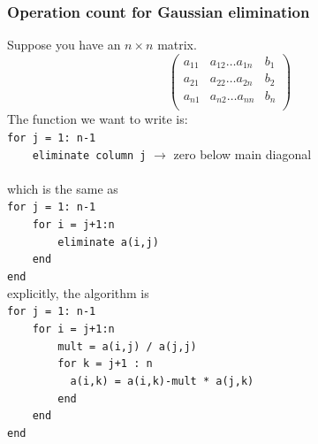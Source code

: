 \documentclass[11pt]{article}
\begin{document}
\subsubsection{Operation count for Gaussian elimination}
Suppose you have an $n \times n$ matrix.
\[
    \begin{pmatrix}
        a_{11} & a_{12} \dots a_{1n} & b_1 \\
        a_{21} & a_{22} \dots a_{2n} & b_2 \\
        a_{n1} & a_{n2} \dots a_{nn} & b_n \\
    \end{pmatrix}
\]
The function we want to write is:\\
\verb|for j = 1: n-1|\\
\verb|    eliminate column j| $\longrightarrow$ zero below main diagonal\\\\
which is the same as\\
\verb|for j = 1: n-1|\\
\verb|    for i = j+1:n|\\
\verb|        eliminate a(i,j)|\\
\verb|    end|\\
\verb|end|\\

\newpage
explicitly, the algorithm is \\
\verb|for j = 1: n-1|\\
\verb|    for i = j+1:n|\\
\verb|        mult = a(i,j) / a(j,j)|\\
\verb|        for k = j+1 : n|\\
\verb|          a(i,k) = a(i,k)-mult * a(j,k)|\\
\verb|        end|\\
\verb|    end|\\
\verb|end|\\
\end{document}

